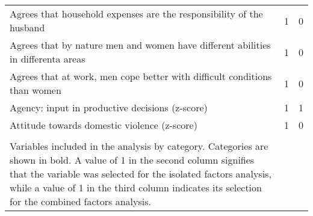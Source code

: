\begin{longtable}{m{11cm}cc}
Agrees that household expenses are the responsibility of the husband&1&0\\
Agrees that by nature men and women have different abilities in differenta areas&1&0\\
Agrees that at work, men cope better with difficult conditions than women&1&0\\
Agency: input in productive decisions (z-score)&1&1\\
Attitude towards domestic violence (z-score)&1&0\\
\midrule
\begin{minipage}{17cm}
\small{
{\textit Notes:} \\
Variables included in the analysis by category. Categories are shown in bold. A value of 1 in the second column signifies that the variable was selected for the isolated factors analysis, while a value of 1 in the third column indicates its selection for the combined factors analysis.
}
\end{minipage} \\* \bottomrule
\end{longtable}
